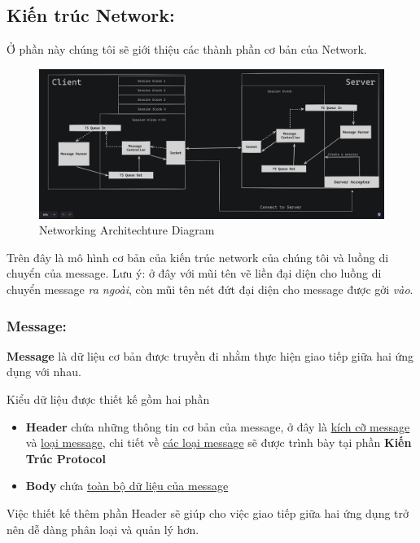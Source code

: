 \subsection{Kiến trúc Network: }
\label{sec:network-archi}
Ở phần này chúng tôi sẽ giới thiệu các thành phần cơ bản của Network. \\

\begin{figure}[H]
	\centering
	\includegraphics[width=\linewidth]{latex/architechture/architechture_diagram.png}
	\caption{Networking Architechture Diagram}
	\label{fig:network}
\end{figure}

Trên đây là mô hình cơ bản của kiến trúc network của chúng tôi và luồng di chuyển của message. Lưu ý: ở đây với mũi tên vẽ liền đại diện cho luồng di chuyển message \textit{ra ngoài}, còn mũi tên nét đứt đại diện cho message được gởi \textit{vào}.

\subsubsection{Message: }
\label{sec:message}
\textbf{Message} là dữ liệu cơ bản được truyền đi nhằm thực hiện giao tiếp giữa hai ứng dụng với nhau.

Kiểu dữ liệu được thiết kế gồm hai phần
\begin{itemize}
	\item \textbf{Header} chứa những thông tin cơ bản của message, ở đây là \underline{kích cỡ message} và \underline{loại message}, chi tiết về \underline{các loại message} sẽ được trình bày tại phần \textbf{Kiến Trúc Protocol}
	\item \textbf{Body} chứa \underline{toàn bộ dữ liệu của message}
\end{itemize}

Việc thiết kế thêm phần Header sẽ giúp cho việc giao tiếp giữa hai ứng dụng trở nên dễ dàng phân loại và quản lý hơn.

